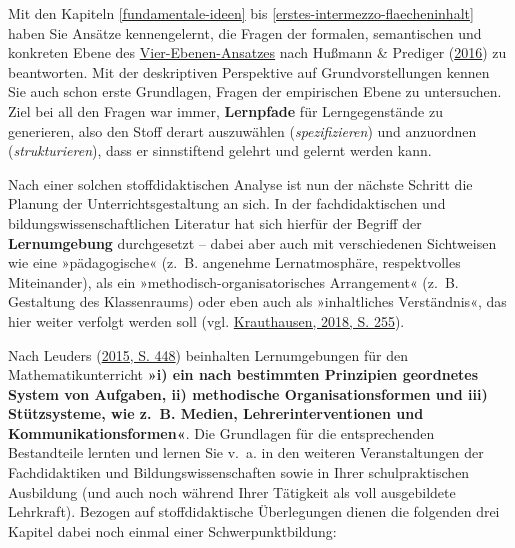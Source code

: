 \documentclass[
]{scrbook}
\theoremstyle{definition}
\theoremstyle{definition}
\theoremstyle{definition}
\theoremstyle{definition}
\theoremstyle{remark}
\begin{document}
Mit den Kapiteln \ref{fundamentale-ideen} bis \ref{erstes-intermezzo-flaecheninhalt} haben Sie Ansätze kennengelernt, die Fragen der \textcolor{formalColor}{formalen}, \textcolor{semanticColor}{semantischen} und \textcolor{concreteColor}{konkreten} Ebene des \protect\hyperlink{tab:fragen-ebenen}{Vier-Ebenen-Ansatzes} nach Hußmann \& Prediger (\protect\hyperlink{ref-Hussmann:2016}{2016}) zu beantworten. Mit der deskriptiven Perspektive auf Grundvorstellungen kennen Sie auch schon erste Grundlagen, Fragen der \textcolor{empiricColor}{empirischen} Ebene zu untersuchen. Ziel bei all den Fragen war immer, \textbf{Lernpfade} für Lerngegenstände zu generieren, also den Stoff derart auszuwählen (\emph{spezifizieren}) und anzuordnen (\emph{strukturieren}), dass er sinnstiftend gelehrt und gelernt werden kann.

Nach einer solchen stoffdidaktischen Analyse ist nun der nächste Schritt die Planung der Unterrichtsgestaltung an sich. In der fachdidaktischen und bildungswissenschaftlichen Literatur hat sich hierfür der Begriff der \textbf{Lernumgebung} durchgesetzt -- dabei aber auch mit verschiedenen Sichtweisen wie eine »pädagogische« (z.~B. angenehme Lernatmosphäre, respektvolles Miteinander), als ein »methodisch-organisatorisches Arrangement« (z.~B. Gestaltung des Klassenraums) oder eben auch als »inhaltliches Verständnis«, das hier weiter verfolgt werden soll (vgl. \protect\hyperlink{ref-Krauthausen:2018}{Krauthausen, 2018, S. 255}).

Nach Leuders (\protect\hyperlink{ref-Leuders2015}{2015, S. 448}) beinhalten Lernumgebungen für den Mathematikunterricht \textbf{»i) ein nach bestimmten Prinzipien geordnetes System von Aufgaben, ii) methodische Organisationsformen und iii) Stützsysteme, wie z.~B. Medien, Lehrerinterventionen und Kommunikationsformen«}. Die Grundlagen für die entsprechenden Bestandteile lernten und lernen Sie v.~a. in den weiteren Veranstaltungen der Fachdidaktiken und Bildungswissenschaften sowie in Ihrer schulpraktischen Ausbildung (und auch noch während Ihrer Tätigkeit als voll ausgebildete Lehrkraft). Bezogen auf stoffdidaktische Überlegungen dienen die folgenden drei Kapitel dabei noch einmal einer Schwerpunktbildung:
\end{document}
